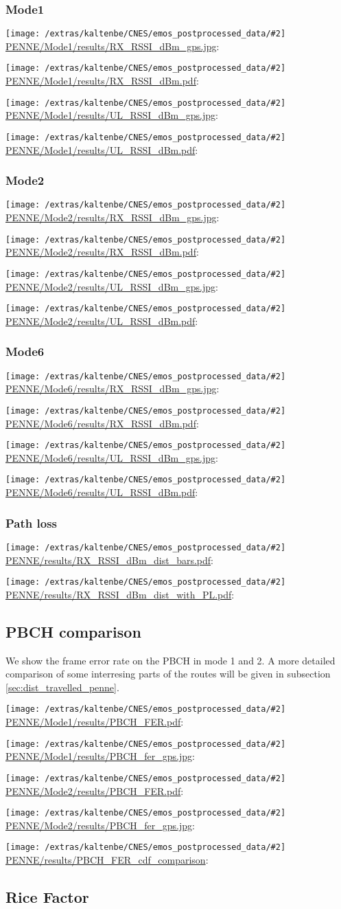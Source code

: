 \documentclass[a4paper,10pt]{article}
\newcommand{\printfile}[2][]{
 \begin{minipage}{8cm}
  \centering
  \texttt{[image: /extras/kaltenbe/CNES/emos\_postprocessed\_data/\#2]}
  \url{#2}: #1

 \end{minipage}
}
\begin{document}
\subsubsection{Mode1}
\printfile{PENNE/Mode1/results/RX_RSSI_dBm_gps.jpg}
\printfile{PENNE/Mode1/results/RX_RSSI_dBm.pdf}

\printfile{PENNE/Mode1/results/UL_RSSI_dBm_gps.jpg}
\printfile{PENNE/Mode1/results/UL_RSSI_dBm.pdf}

\subsubsection{Mode2}

\printfile{PENNE/Mode2/results/RX_RSSI_dBm_gps.jpg}
\printfile{PENNE/Mode2/results/RX_RSSI_dBm.pdf}

\printfile{PENNE/Mode2/results/UL_RSSI_dBm_gps.jpg}
\printfile{PENNE/Mode2/results/UL_RSSI_dBm.pdf}

\subsubsection{Mode6}
\printfile{PENNE/Mode6/results/RX_RSSI_dBm_gps.jpg}
\printfile{PENNE/Mode6/results/RX_RSSI_dBm.pdf}

\printfile{PENNE/Mode6/results/UL_RSSI_dBm_gps.jpg}
\printfile{PENNE/Mode6/results/UL_RSSI_dBm.pdf}

\subsubsection{Path loss}

\printfile{PENNE/results/RX_RSSI_dBm_dist_bars.pdf}
\printfile{PENNE/results/RX_RSSI_dBm_dist_with_PL.pdf}


\subsection{PBCH comparison}
We show the frame error rate on the PBCH in mode 1 and 2. A more detailed comparison of some interresing parts of the routes will be given in subsection \ref{sec:dist_travelled_penne}.

\printfile{PENNE/Mode1/results/PBCH_FER.pdf}
\printfile{PENNE/Mode1/results/PBCH_fer_gps.jpg}

\printfile{PENNE/Mode2/results/PBCH_FER.pdf}
\printfile{PENNE/Mode2/results/PBCH_fer_gps.jpg}

\printfile{PENNE/results/PBCH_FER_cdf_comparison}

\subsection{Rice Factor}
\end{document}
